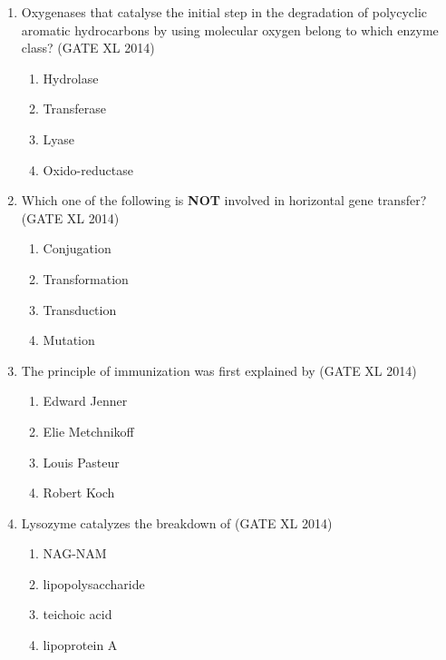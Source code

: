 \documentclass[journal,12pt,onecolumn]{IEEEtran}
\theoremstyle{remark}
\begin{document}
\begin{enumerate}
\item Oxygenases that catalyse the initial step in the degradation of polycyclic aromatic hydrocarbons by using molecular oxygen belong to which enzyme class? \hfill(GATE XL 2014)
\begin{multicols}{2}
\begin{enumerate}
\item Hydrolase
\item Transferase
\item Lyase
\item Oxido-reductase
\end{enumerate}
\end{multicols}

\item Which one of the following is \textbf{NOT}     involved in horizontal gene transfer? \hfill(GATE XL 2014)
\begin{multicols}{2}
\begin{enumerate}
\item Conjugation
\item Transformation
\item Transduction
\item Mutation
\end{enumerate}
\end{multicols}

\item The principle of immunization was first explained by \hfill(GATE XL 2014)
\begin{multicols}{2}
\begin{enumerate}
\item Edward Jenner
\item Elie Metchnikoff
\item Louis Pasteur
\item Robert Koch
\end{enumerate}
\end{multicols}

\item Lysozyme catalyzes the breakdown of \hfill(GATE XL 2014)
\begin{multicols}{2}
\begin{enumerate}
\item NAG-NAM
\item lipopolysaccharide
\item teichoic acid
\item lipoprotein A
\end{enumerate}
\end{multicols}


\end{enumerate}
\end{document}
